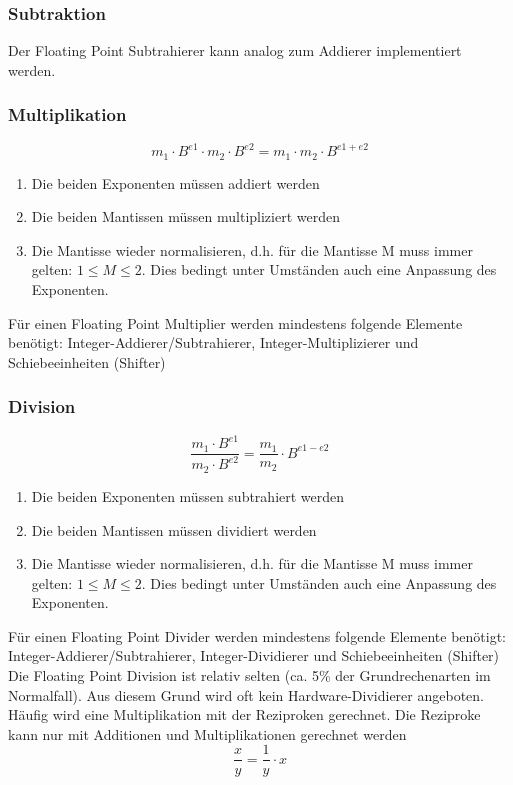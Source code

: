 \subsubsection{Subtraktion}
Der Floating Point Subtrahierer kann analog zum Addierer implementiert werden.

\subsubsection{Multiplikation}
\begin{equation}
	m_1 \cdot B^{e1} \cdot m_2 \cdot B^{e2} = m_1 \cdot m_2 \cdot B^{e1 + e2}
\end{equation}
\begin{enumerate}
	\item Die beiden Exponenten müssen addiert werden
	\item Die beiden Mantissen müssen multipliziert werden
	\item Die Mantisse wieder normalisieren, d.h. für die Mantisse M muss immer gelten: $1 \leq M \leq 2$. Dies bedingt unter Umständen auch eine Anpassung des Exponenten.
\end{enumerate}
Für einen Floating Point Multiplier werden mindestens folgende Elemente benötigt: Integer-Addierer/Subtrahierer, Integer-Multiplizierer und Schiebeeinheiten (Shifter)

\subsubsection{Division}
\begin{equation}
\frac{m_1 \cdot B^{e1}}{m_2 \cdot B^{e2}} = \frac{m_1}{m_2} \cdot B^{e1 - e2}
\end{equation}
\begin{enumerate}
	\item Die beiden Exponenten müssen subtrahiert werden
	\item  Die beiden Mantissen müssen dividiert werden
	\item Die Mantisse wieder normalisieren, d.h. für die Mantisse M muss immer gelten: $1 \leq M \leq 2$. Dies bedingt unter Umständen auch eine Anpassung des Exponenten.
\end{enumerate}
Für einen Floating Point Divider werden mindestens folgende Elemente benötigt: Integer-Addierer/Subtrahierer, Integer-Dividierer und Schiebeeinheiten (Shifter) \\
Die Floating Point Division ist relativ selten (ca. 5\% der Grundrechenarten im Normalfall). Aus diesem Grund wird oft kein Hardware-Dividierer angeboten. Häufig wird eine Multiplikation mit der Reziproken gerechnet. Die Reziproke kann nur mit Additionen und Multiplikationen gerechnet werden
\begin{equation}
\frac{x}{y} = \frac{1}{y} \cdot x
\end{equation}

